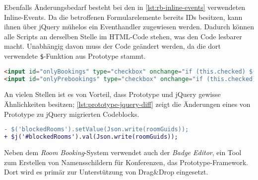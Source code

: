 Ebenfalls Änderungsbedarf besteht bei den in \autoref{lst:rb-inline-events} verwendeten
Inline-Events. Da die betroffenen Formularelemente bereits IDs besitzen, kann ihnen über jQuery
mühelos ein Eventhandler zugewiesen werden. Dadurch können alle Scripts an derselben Stelle im
HTML-Code stehen, was den Code lesbarer macht. Unabhängig davon muss der Code geändert werden, da
die dort verwendete \lstinline{$}-Funktion aus Prototype stammt.

\begin{lstlisting}[language=HTML,label=lst:rb-inline-events,caption=Inline-Eventhandler]
<input id="onlyBookings" type="checkbox" onchange="if (this.checked) $('onlyPrebookings').checked = false;"/>
<input id="onlyPrebookings" type="checkbox" onchange="if (this.checked) $('onlyBookings').checked = false;" />
\end{lstlisting}

An vielen Stellen ist es von Vorteil, dass Prototype und jQuery gewisse Ähnlichkeiten besitzen;
\autoref{lst:prototype-jquery-diff} zeigt die Änderungen eines von Prototype zu jQuery migrierten
Codeblocks.

\begin{lstlisting}[language=diff,label=lst:prototype-jquery-diff,caption=Ähnlichkeit zwischen jQuery und Prototype]
- $('blockedRooms').setValue(Json.write(roomGuids));
+ $j('#blockedRooms').val(Json.write(roomGuids));
\end{lstlisting}

Neben dem \emph{Room Booking}-System verwendet auch der \emph{Badge Editor}, ein Tool zum Erstellen
von Namensschildern für Konferenzen, das Prototype-Framework. Dort wird es primär zur Unterstützung
von Drag\&Drop eingesetzt.



